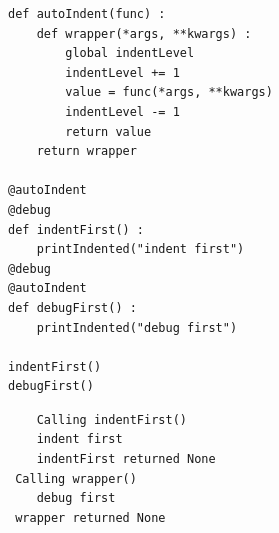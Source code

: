 \begin{frame}[fragile]
%
\begin{tcbraster}[raster columns=2,
                  raster equal height,
                  nobeforeafter,
                  raster column skip=0.2cm]
\begin{codebox}[... continued]
\begin{verbatim}
def autoIndent(func) :
    def wrapper(*args, **kwargs) :
        global indentLevel
        indentLevel += 1
        value = func(*args, **kwargs)
        indentLevel -= 1
        return value
    return wrapper

@autoIndent
@debug
def indentFirst() :
    printIndented("indent first")
@debug
@autoIndent
def debugFirst() :
    printIndented("debug first")

indentFirst()
debugFirst()
\end{verbatim}
\end{codebox}
%
\begin{cmdbox}
\begin{verbatim}
    Calling indentFirst()
    indent first
    indentFirst returned None
 Calling wrapper()
    debug first
 wrapper returned None
\end{verbatim}
\end{cmdbox}
\end{tcbraster}
%
\end{frame}


